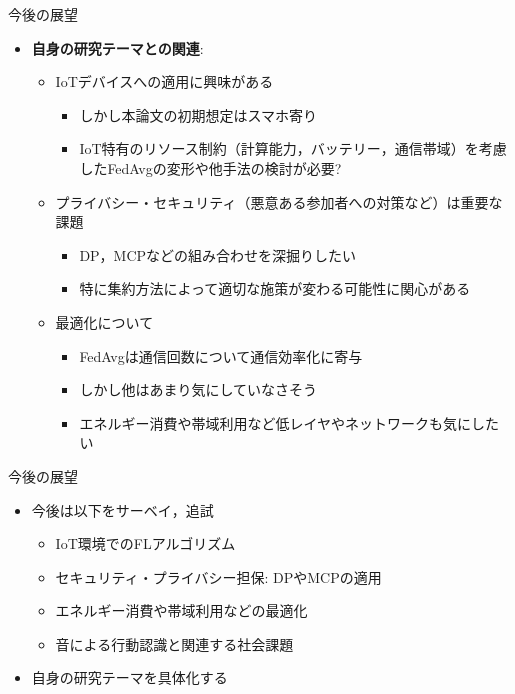 \documentclass[unicode,12pt,aspectratio=169, dvipdfmx]{beamer}
\begin{document}
\begin{frame}{今後の展望}
\begin{itemize}
    \item \textbf{自身の研究テーマとの関連}:
    \begin{itemize}
        \item IoTデバイスへの適用に興味がある
        \begin{itemize}
            \item しかし本論文の初期想定はスマホ寄り
            \item IoT特有のリソース制約（計算能力，バッテリー，通信帯域）を考慮したFedAvgの変形や他手法の検討が必要?
        \end{itemize}
        \item プライバシー・セキュリティ（悪意ある参加者への対策など）は重要な課題
        \begin{itemize}
            \item DP，MCPなどの組み合わせを深掘りしたい
            \item 特に集約方法によって適切な施策が変わる可能性に関心がある
        \end{itemize}
        \item 最適化について
        \begin{itemize}
            \item FedAvgは通信回数について通信効率化に寄与
            \item しかし他はあまり気にしていなさそう
            \item エネルギー消費や帯域利用など低レイヤやネットワークも気にしたい
        \end{itemize}
    \end{itemize}
\end{itemize}
\end{frame}


\begin{frame}{今後の展望}
    \begin{itemize}
        \item 今後は以下をサーベイ，追試
        \begin{itemize}
            \item IoT環境でのFLアルゴリズム
            \item セキュリティ・プライバシー担保: DPやMCPの適用
            \item エネルギー消費や帯域利用などの最適化
            \item 音による行動認識と関連する社会課題
        \end{itemize}
        \item 自身の研究テーマを具体化する        
    \end{itemize}
\end{frame}
\end{document}
